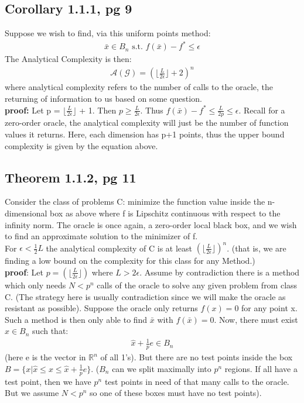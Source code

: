 \documentclass[12pt,a4paper]{article}
\begin{document}
	\subsection*{Corollary 1.1.1, pg 9}\label{cor111}
	Suppose we wish to find, via this uniform points method:
	\begin{align*}
		\bar{x} \in B_n \text{ s.t. } f(\bar{x}) - f^* \leq \epsilon
	\end{align*}
	The Analytical Complexity is then:
	\begin{align*}
		\mathcal{A}(\mathcal{G}) = (\lfloor \frac{L}{2\epsilon} \rfloor + 2)^n
	\end{align*}
	where analytical complexity refers to the number of calls to the oracle, the returning of information to us based on some question.\\
	\textbf{proof:} Let p = $\lfloor \frac{L}{2\epsilon} \rfloor$ + 1. Then $p \geq \frac{L}{2\epsilon}$. Thus $f(\bar{x}) - f^* \leq \frac{L}{2p} \leq \epsilon$. Recall for a zero-order oracle, the analytical complexity will just be the number of function values it returns. Here, each dimension has p+1 points, thus the upper bound complexity is given by the equation above. 
	
	\subsection*{Theorem 1.1.2, pg 11}\label{thm112}
	Consider the class of problems C: minimize the function value inside the n-dimensional box as above where f is Lipschitz continuous with respect to the infinity norm. The oracle is once again, a zero-order local black box, and we wish to find an approximate solution to the minimizer of f.\\
	For $\epsilon < \frac{1}{2}L$ the analytical complexity of C is at least $ (\lfloor \frac{L}{2\epsilon} \rfloor )^n$. (that is, we are finding a low bound on the complexity for this class for any Method.)\\
	\textbf{proof}: Let $p = ( \lfloor \frac{L}{2\epsilon} \rfloor )$ where $L > 2\epsilon$. Assume by contradiction there is a method which only needs $N < p^n$ calls of the oracle to solve any given problem from class C. (The strategy here is usually contradiction since we will make the oracle as resistant as possible). Suppose the oracle only returns $f(x) = 0$ for any point x. Such a method is then only able to find $\bar{x}$ with $f(\bar{x}) = 0$. Now, there must exist $\hat{x} \in B_n$ such that:
	\begin{align*}
		\hat{x} + \frac{1}{p}e \in B_n
	\end{align*}
	(here e is the vector in $\mathbb{R}^n$ of all 1's). But there are no test points inside the box $B = \{x | \hat{x} \leq x \leq \hat{x} + \frac{1}{p}e\}$. ($B_n$ can we split maximally into $p^n$ regions. If all have a test point, then we have $p^n$ test points in need of that many calls to the oracle. But we assume $N < p^n$ so one of these boxes must have no test points). 
	
\end{document}
